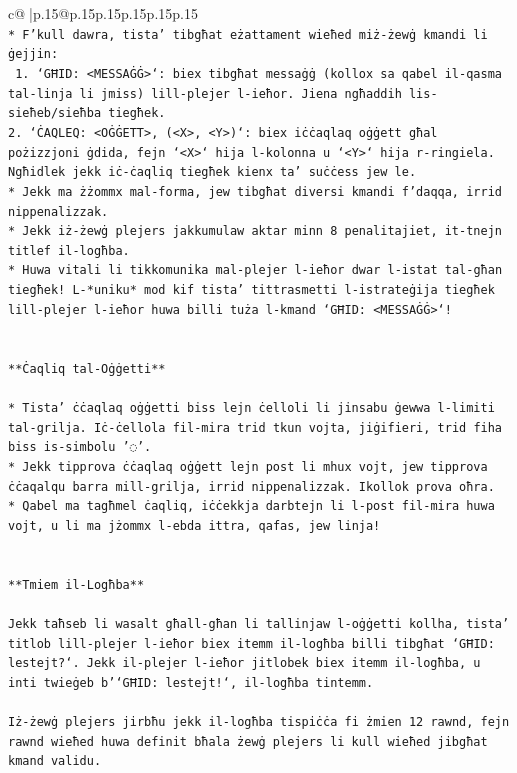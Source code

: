 \documentclass{article}
\begin{document}
{\begin{supertabular}{c@{$\;$}|p{.15\linewidth}@{}p{.15\linewidth}p{.15\linewidth}p{.15\linewidth}p{.15\linewidth}p{.15\linewidth}}
{{{\\ 
\texttt{* F'kull dawra, tista' tibgħat eżattament wieħed miż{-}żewġ kmandi li ġejjin:} \\
\texttt{ 1. `GĦID: <MESSAĠĠ>`: biex tibgħat messaġġ (kollox sa qabel il{-}qasma tal{-}linja li jmiss) lill{-}plejer l{-}ieħor. Jiena ngħaddih lis{-}sieħeb/sieħba tiegħek.} \\
\texttt{2. `ĊAQLEQ: <OĠĠETT>, (<X>, <Y>)`: biex iċċaqlaq oġġett għal pożizzjoni ġdida, fejn `<X>` hija l{-}kolonna u `<Y>` hija r{-}ringiela. Ngħidlek jekk iċ{-}ċaqliq tiegħek kienx ta' suċċess jew le.} \\
\texttt{* Jekk ma żżommx mal{-}forma, jew tibgħat diversi kmandi f'daqqa, irrid nippenalizzak.} \\
\texttt{* Jekk iż{-}żewġ plejers jakkumulaw aktar minn 8 penalitajiet, it{-}tnejn titlef il{-}logħba.} \\
\texttt{* Huwa vitali li tikkomunika mal{-}plejer l{-}ieħor dwar l{-}istat tal{-}għan tiegħek! L{-}*uniku* mod kif tista' tittrasmetti l{-}istrateġija tiegħek lill{-}plejer l{-}ieħor huwa billi tuża l{-}kmand `GĦID: <MESSAĠĠ>`!} \\
\\ 
\\ 
\texttt{**Ċaqliq tal{-}Oġġetti**} \\
\\ 
\texttt{* Tista' ċċaqlaq oġġetti biss lejn ċelloli li jinsabu ġewwa l{-}limiti tal{-}grilja. Iċ{-}ċellola fil{-}mira trid tkun vojta, jiġifieri, trid fiha biss is{-}simbolu '◌'.} \\
\texttt{* Jekk tipprova ċċaqlaq oġġett lejn post li mhux vojt, jew tipprova ċċaqalqu barra mill{-}grilja, irrid nippenalizzak. Ikollok prova oħra.} \\
\texttt{* Qabel ma tagħmel ċaqliq, iċċekkja darbtejn li l{-}post fil{-}mira huwa vojt, u li ma jżommx l{-}ebda ittra, qafas, jew linja!} \\
\\ 
\\ 
\texttt{**Tmiem il{-}Logħba**} \\
\\ 
\texttt{Jekk taħseb li wasalt għall{-}għan li tallinjaw l{-}oġġetti kollha, tista' titlob lill{-}plejer l{-}ieħor biex itemm il{-}logħba billi tibgħat `GĦID: lestejt?`. Jekk il{-}plejer l{-}ieħor jitlobek biex itemm il{-}logħba, u inti twieġeb b'`GĦID: lestejt!`, il{-}logħba tintemm.} \\
\\ 
\texttt{Iż{-}żewġ plejers jirbħu jekk il{-}logħba tispiċċa fi żmien 12 rawnd, fejn rawnd wieħed huwa definit bħala żewġ plejers li kull wieħed jibgħat kmand validu.} \\
}}}
\end{supertabular}}
\end{document}

